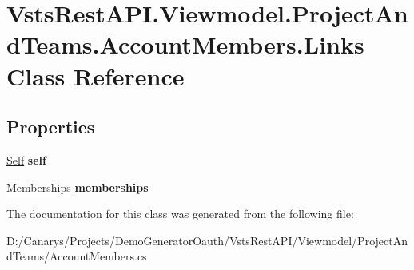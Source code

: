 \hypertarget{class_vsts_rest_a_p_i_1_1_viewmodel_1_1_project_and_teams_1_1_account_members_1_1_links}{}\section{Vsts\+Rest\+A\+P\+I.\+Viewmodel.\+Project\+And\+Teams.\+Account\+Members.\+Links Class Reference}
\label{class_vsts_rest_a_p_i_1_1_viewmodel_1_1_project_and_teams_1_1_account_members_1_1_links}
\subsection*{Properties}
\begin{DoxyCompactItemize}
\item 
\mbox{\label{class_vsts_rest_a_p_i_1_1_viewmodel_1_1_project_and_teams_1_1_account_members_1_1_links_a780b4699eadd82ff0c3110045f40a770}} 
\mbox{\hyperlink{class_vsts_rest_a_p_i_1_1_viewmodel_1_1_project_and_teams_1_1_account_members_1_1_self}{Self}} {\bfseries self}
\item 
\mbox{\label{class_vsts_rest_a_p_i_1_1_viewmodel_1_1_project_and_teams_1_1_account_members_1_1_links_abc1c126555dbb8c135baf083e97ec19d}} 
\mbox{\hyperlink{class_vsts_rest_a_p_i_1_1_viewmodel_1_1_project_and_teams_1_1_account_members_1_1_memberships}{Memberships}} {\bfseries memberships}
\end{DoxyCompactItemize}


The documentation for this class was generated from the following file\+:\begin{DoxyCompactItemize}
\item 
D\+:/\+Canarys/\+Projects/\+Demo\+Generator\+Oauth/\+Vsts\+Rest\+A\+P\+I/\+Viewmodel/\+Project\+And\+Teams/Account\+Members.\+cs\end{DoxyCompactItemize}
